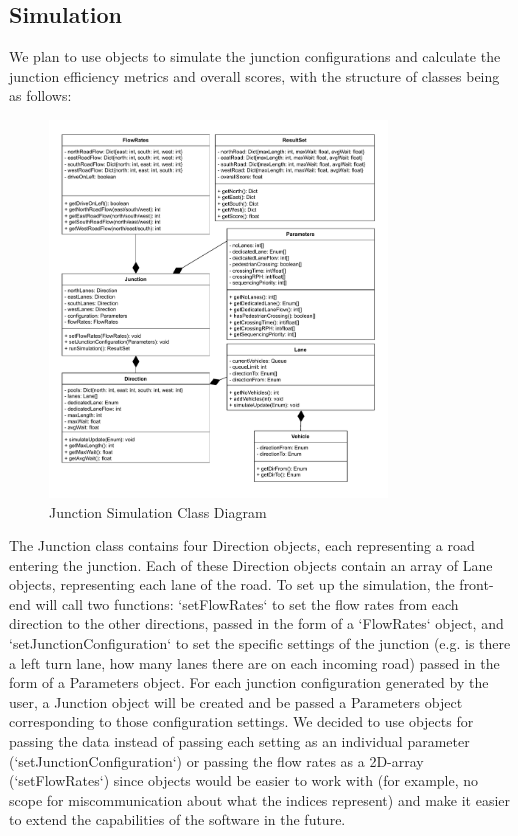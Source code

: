 \documentclass{article}
\begin{document}
\subsection{Simulation}

We plan to use objects to simulate the junction configurations and calculate 
the junction efficiency metrics and overall scores, with the structure of classes being as follows:

\begin{figure}[H]
    \centering
    \includegraphics[width=0.8\textwidth]{JunctionSimulationClassDiagram.drawio.pdf}
    \caption{Junction Simulation Class Diagram}
    \label{class diagram}
\end{figure}

The Junction class contains four Direction objects, each representing a road entering the junction. Each of these Direction 
objects contain an array of Lane objects, representing each lane of the road. To set up the simulation, the front-end will 
call two functions: `setFlowRates` to set the flow rates from each direction to the other directions, passed in the form of 
a `FlowRates` object, and `setJunctionConfiguration` to set the specific settings of the junction (e.g. is there a left turn 
lane, how many lanes there are on each incoming road) passed in the form of a Parameters object. For each junction configuration 
generated by the user, a Junction object will be created and be passed a Parameters object corresponding to those configuration 
settings. We decided to use objects for passing the data instead of passing each setting as an individual parameter 
(`setJunctionConfiguration`) or passing the flow rates as a 2D-array (`setFlowRates`) since objects would be easier to work with 
(for example, no scope for miscommunication about what the indices represent) and make it easier to extend the capabilities of 
the software in the future.
\end{document}

